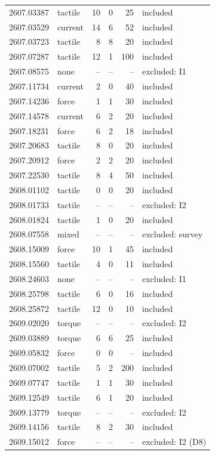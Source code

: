 \begin{longtable}{@{}llrrrl@{}}
2607.03387 & tactile & 10 & 0 & 25 & included \\
2607.03529 & current & 14 & 6 & 52 & included \\
2607.03723 & tactile & 8 & 8 & 20 & included \\
2607.07287 & tactile & 12 & 1 & 100 & included \\
2607.08575 & none & -- & -- & -- & excluded: I1 \\
2607.11734 & current & 2 & 0 & 40 & included \\
2607.14236 & force & 1 & 1 & 30 & included \\
2607.14578 & current & 6 & 2 & 20 & included \\
2607.18231 & force & 6 & 2 & 18 & included \\
2607.20683 & tactile & 8 & 0 & 20 & included \\
2607.20912 & force & 2 & 2 & 20 & included \\
2607.22530 & tactile & 8 & 4 & 50 & included \\
2608.01102 & tactile & 0 & 0 & 20 & included \\
2608.01733 & tactile & -- & -- & -- & excluded: I2 \\
2608.01824 & tactile & 1 & 0 & 20 & included \\
2608.07558 & mixed & -- & -- & -- & excluded: survey \\
2608.15009 & force & 10 & 1 & 45 & included \\
2608.15560 & tactile & 4 & 0 & 11 & included \\
2608.24603 & none & -- & -- & -- & excluded: I1 \\
2608.25798 & tactile & 6 & 0 & 16 & included \\
2608.25872 & tactile & 12 & 0 & 10 & included \\
2609.02020 & torque & -- & -- & -- & excluded: I2 \\
2609.03889 & torque & 6 & 6 & 25 & included \\
2609.05832 & force & 0 & 0 & -- & included \\
2609.07002 & tactile & 5 & 2 & 200 & included \\
2609.07747 & tactile & 1 & 1 & 30 & included \\
2609.12549 & tactile & 6 & 1 & 20 & included \\
2609.13779 & torque & -- & -- & -- & excluded: I2 \\
2609.14156 & tactile & 8 & 2 & 30 & included \\
2609.15012 & force & -- & -- & -- & excluded: I2 (D8) \\

\end{longtable}
